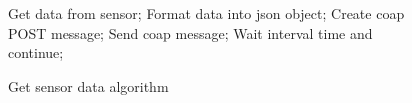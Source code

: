 
\begin{figure}[H]
    \begin{algorithmic}[1]
        \State Get data from sensor;
           \State Format data into \gls{json} object;
           \State Create \gls{coap} POST message;
           \State Send \gls{coap} message;
        \Else
            \State Wait interval time and continue;
        \EndIf
        \EndWhile\label{euclidendwhile}
        \EndProcedure
    \end{algorithmic}
    \caption{Get sensor data algorithm}\label{alg:get_send_data_alg}
\end{figure}